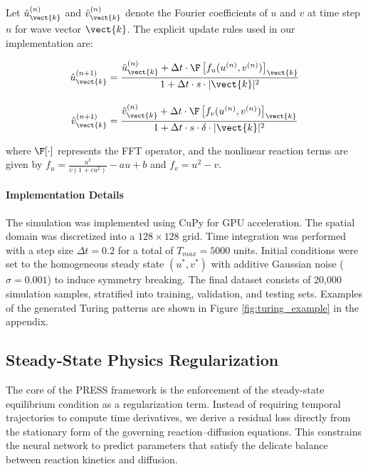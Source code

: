 \documentclass{article} %
\begin{document}
Let $\hat{u}^{(n)}_{\vect{k}}$ and $\hat{v}^{(n)}_{\vect{k}}$ denote the Fourier coefficients of $u$ and $v$ at time step $n$ for wave vector $\vect{k}$. The explicit update rules used in our implementation are:

\begin{align}
    \hat{u}^{(n+1)}_{\vect{k}} &= \frac{\hat{u}^{(n)}_{\vect{k}} + \Delta t \cdot \F \left[ f_u(u^{(n)}, v^{(n)}) \right]_{\vect{k}}}{1 + \Delta t \cdot s \cdot |\vect{k}|^2} \label{eq:spectral_update_u} \\[1em]
    \hat{v}^{(n+1)}_{\vect{k}} &= \frac{\hat{v}^{(n)}_{\vect{k}} + \Delta t \cdot \F \left[ f_v(u^{(n)}, v^{(n)}) \right]_{\vect{k}}}{1 + \Delta t \cdot s \cdot \delta \cdot |\vect{k}|^2} \label{eq:spectral_update_v}
\end{align}

where $\F[\cdot]$ represents the FFT operator, and the nonlinear reaction terms are given by $f_u = \frac{u^2}{v(1 + c u^2)} - a u + b$ and $f_v = u^2 - v$.

\paragraph{Implementation Details}

The simulation was implemented using CuPy for GPU acceleration. The spatial domain was discretized into a $128 \times 128$ grid. Time integration was performed with a step size $\Delta t = 0.2$ for a total of $T_{max} = 5000$ units. Initial conditions were set to the homogeneous steady state $(u^*, v^*)$ with additive Gaussian noise ($\sigma=0.001$) to induce symmetry breaking. The final dataset consists of 20,000 simulation samples, stratified into training, validation, and testing sets. Examples of the generated Turing patterns are shown in Figure \ref{fig:turing_example} in the appendix.

\subsection{Steady-State Physics Regularization}

The core of the PRESS framework is the enforcement of the steady-state equilibrium condition as a regularization term. Instead of requiring temporal trajectories to compute time derivatives, we derive a residual loss directly from the stationary form of the governing reaction--diffusion equations. This constrains the neural network to predict parameters that satisfy the delicate balance between reaction kinetics and diffusion.
\end{document}

